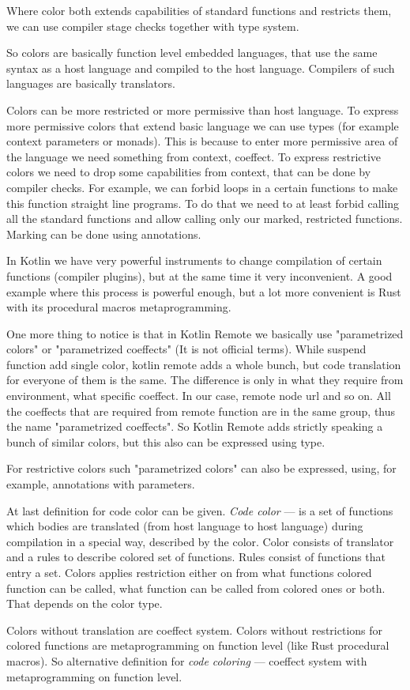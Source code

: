 \documentclass[a4paper,11pt,oneside]{article}
\newcommand{\term}[1]{\textit{#1}}
\begin{document}
Where color both extends capabilities of standard functions and restricts them, we 
can use compiler stage checks together with type system.

So colors are basically function level embedded languages, that use the same syntax as a host language and 
compiled to the host language. Compilers of such languages are basically translators.

Colors can be more restricted or more permissive than host language. To express more permissive colors 
that extend basic language we can use types (for example context parameters or monads).
This is because to enter more permissive area of the language we need something from context,
coeffect. To express restrictive colors we need to drop some capabilities from context,
that can be done by compiler checks. For example, we can forbid loops in a certain functions
to make this function straight line programs. To do that we need to at least forbid calling 
all the standard functions and allow calling only our marked, restricted functions. Marking 
can be done using annotations.

In Kotlin we have very powerful instruments to change compilation of certain functions (compiler plugins), 
but at the same time it very inconvenient. A good example where this process is powerful enough, but 
a lot more convenient is Rust with its procedural macros metaprogramming.

One more thing to notice is that in Kotlin Remote we basically use "parametrized colors" or "parametrized coeffects"
(It is not official terms). While suspend function add single color, kotlin remote adds a whole bunch,
but code translation for everyone of them is the same. The difference is only in what they require from
environment, what specific coeffect. In our case, remote node url and so on. All the
coeffects that are required from remote function are in the same group, thus the name 
"parametrized coeffects". So Kotlin Remote adds strictly speaking a bunch of similar colors, but this
also can be expressed using type. 

For restrictive colors such "parametrized colors" can also be expressed, using, for example, annotations 
with parameters.

At last definition for code color can be given. \term{Code color} --- is a set of functions which
bodies are translated (from host language to host language) during compilation in a special way,
described by the color. Color consists of translator and a rules to describe colored set of
functions. Rules consist of functions that entry a set. Colors applies restriction either on from
what functions colored function can be called, what function can be called from colored ones or
both. That depends on the color type.

Colors without translation are coeffect system. Colors without restrictions for colored functions
are metaprogramming on function level (like Rust procedural macros). So alternative definition for 
\term{code coloring} --- coeffect system with metaprogramming on function level.
\end{document}
